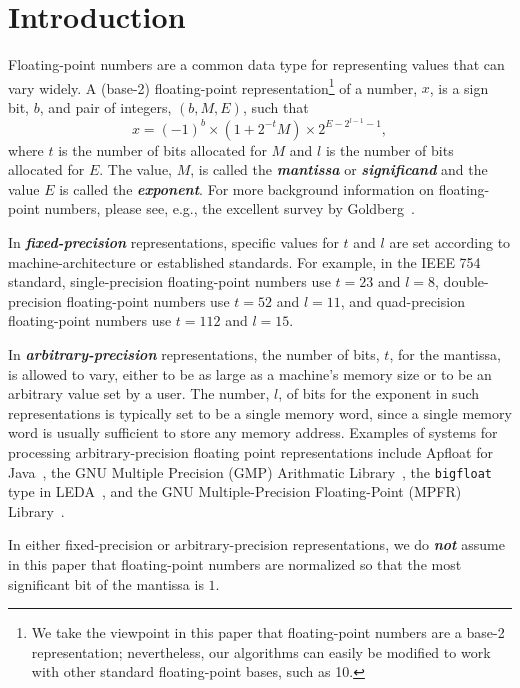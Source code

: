 \documentclass[11pt]{article}
\renewcommand{\emph}[1]{\textit{\textbf{#1}}}
\begin{document}
\section{Introduction}
Floating-point numbers are a common data type for representing values
that can vary widely.
A (base-2) floating-point
representation\footnote{We take the viewpoint in this paper
   that floating-point numbers are a base-2 representation;
   nevertheless, our algorithms can easily be modified to work with
   other standard floating-point bases, such as 10.}
of a number, $x$, is a sign bit, $b$, and pair of
integers, $(b,M,E)$, such that
\[
x = (-1)^b \times (1+ 2^{-t}M) \times 2^{E-2^{l-1}-1},
\]
where $t$ is the number of bits allocated for $M$ and $l$ is the
number of bits allocated for $E$.
The value, $M$, is called the 
\emph{mantissa} or \emph{significand}
and the value $E$ is
called the \emph{exponent}.
For more background information on floating-point numbers,
please see, e.g., the excellent survey by
Goldberg~\cite{Goldberg:1991:CSK:103162.103163}.

In \emph{fixed-precision} representations, specific 
values for $t$ and $l$ are set
according to machine-architecture or established standards.
For example, in the IEEE 754 standard, single-precision
floating-point numbers use $t=23$ and $l=8$, double-precision
floating-point numbers use $t=52$ and $l=11$,
and quad-precision floating-point numbers use $t=112$ and $l=15$.

In \emph{arbitrary-precision} representations, 
the number of bits, $t$, for the mantissa, is allowed to vary, either 
to be as large as a machine's memory size or to be 
an arbitrary value set by a user. 
The number, $l$, of bits for the exponent in such
representations is typically set to be a single memory word, since a single
memory word is usually sufficient to store any memory address.
Examples of systems for processing
arbitrary-precision floating point representations
include Apfloat for Java~\cite{apfloat}, the GNU Multiple Precision (GMP)
Arithmatic Library~\cite{GMP},
the \texttt{bigfloat} type in LEDA~\cite{leda},
and
the GNU Multiple-Precision Floating-Point (MPFR) Library~\cite{mpfr,mpfr07}.

In either fixed-precision or arbitrary-precision representations, we do 
\emph{not} assume in this paper 
that floating-point numbers are normalized so that the 
most significant bit of the mantissa is $1$.
\end{document}
